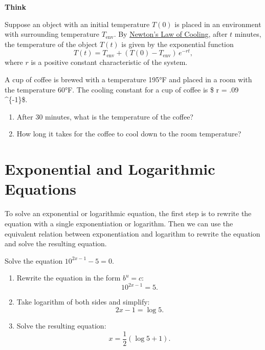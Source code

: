 \documentclass[en,12pt]{elegantbook}
\providecommand{\tightlist}{%
  \setlength{\itemsep}{0pt}\setlength{\parskip}{0pt}}
\newenvironment{rmdthink}{
	\par\noindent
	{
		\makebox[-\width][r]{
			\footnotesize
			\color{green!90}\faLightbulbO
			\hspace*{3pt}
		}
			\textbf{
				\color{second}
				Think 
			}
    }
    \begin{shaded}
    \sffamily
}{
    \par\medskip\ignorespacesafterend
    \end{shaded}
}
\providecommand{\tightlist}{%
  \setlength{\itemsep}{0pt}\setlength{\parskip}{0pt}}
\let\BeginKnitrBlock\begin \let\EndKnitrBlock\end
\begin{document}
\begin{rmdthink}

Suppose an object with an initial temperature \(T(0)\) is placed in an environment with surrounding temperature \(T_{\text{env}}\). By \href{https://en.wikipedia.org/wiki/Newton\%27s_law_of_cooling}{Newton's Law of Cooling}, after \(t\) minutes, the temperature of the object \(T(t)\) is given by the exponential function
\[
T(t)=T_{\text{env}}+(T(0)-T_{\text{env}})\,e^{-rt},
\]
where \(r\) is a positive constant characteristic of the system.

A cup of coffee is brewed with a temperature 195°F and placed in a room with the temperature 60°F. The cooling constant for a cup of coffee is \$ r = .09 \^{}\{-1\}\$.

\begin{enumerate}
\def\labelenumi{\arabic{enumi}.}
\tightlist
\item
  After 30 minutes, what is the temperature of the coffee?
\item
  How long it takes for the coffee to cool down to the room temperature?
\end{enumerate}

\end{rmdthink}

\hypertarget{exponential-and-logarithmic-equations}{%
\section{Exponential and Logarithmic Equations}\label{exponential-and-logarithmic-equations}}

To solve an exponential or logarithmic equation, the first step is to rewrite the equation with a single exponentiation or logarithm. Then we can use the equivalent relation between exponentiation and logarithm to rewrite the equation and solve the resulting equation.

\BeginKnitrBlock{example}
\protect\hypertarget{exm:unnamed-chunk-312}{}{\label{exm:unnamed-chunk-312} }
Solve the equation \(10^{2x-1}-5=0\).
\EndKnitrBlock{example}

\BeginKnitrBlock{solution}


\begin{enumerate}
\def\labelenumi{\arabic{enumi}.}
\tightlist
\item
  Rewrite the equation in the form \(b^u=c\):
  \[10^{2x-1}=5.\]
\item
  Take logarithm of both sides and simplify: \[2x-1=\log 5.\]
\item
  Solve the resulting equation:
  \[x=\frac{1}{2}(\log5+1).\]
\end{enumerate}
\EndKnitrBlock{solution}
\end{document}
